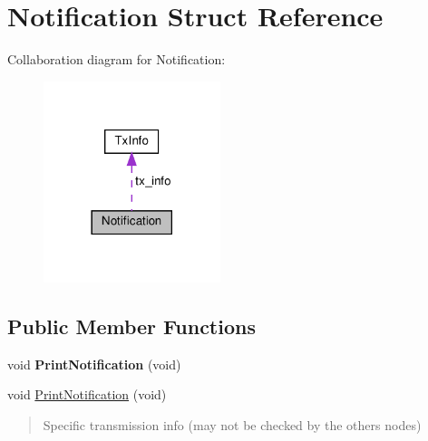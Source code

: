 \hypertarget{structNotification}{}\section{Notification Struct Reference}
\label{structNotification}


Collaboration diagram for Notification\+:\nopagebreak
\begin{figure}[H]
\begin{center}
\leavevmode
\includegraphics[width=146pt]{structNotification__coll__graph}
\end{center}
\end{figure}
\subsection*{Public Member Functions}
\begin{DoxyCompactItemize}
\item 
\mbox{\label{structNotification_a88f50763a773d8d9f548df6408d58839}} 
void {\bfseries Print\+Notification} (void)
\item 
void \hyperlink{structNotification_a88f50763a773d8d9f548df6408d58839}{Print\+Notification} (void)
\begin{DoxyCompactList}\small\item\em \begin{quote}
Specific transmission info (may not be checked by the others nodes) \end{quote}
\end{DoxyCompactList}\end{DoxyCompactItemize}

